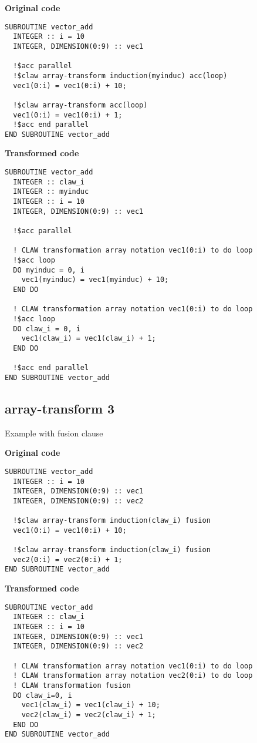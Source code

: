 \textbf{Original code}
\begin{lstlisting}
SUBROUTINE vector_add
  INTEGER :: i = 10
  INTEGER, DIMENSION(0:9) :: vec1

  !$acc parallel
  !$claw array-transform induction(myinduc) acc(loop)
  vec1(0:i) = vec1(0:i) + 10;

  !$claw array-transform acc(loop)
  vec1(0:i) = vec1(0:i) + 1;
  !$acc end parallel
END SUBROUTINE vector_add
\end{lstlisting}


\textbf{Transformed code}
\begin{lstlisting}
SUBROUTINE vector_add
  INTEGER :: claw_i
  INTEGER :: myinduc
  INTEGER :: i = 10
  INTEGER, DIMENSION(0:9) :: vec1

  !$acc parallel

  ! CLAW transformation array notation vec1(0:i) to do loop
  !$acc loop
  DO myinduc = 0, i
    vec1(myinduc) = vec1(myinduc) + 10;
  END DO

  ! CLAW transformation array notation vec1(0:i) to do loop
  !$acc loop
  DO claw_i = 0, i
    vec1(claw_i) = vec1(claw_i) + 1;
  END DO
  
  !$acc end parallel
END SUBROUTINE vector_add
\end{lstlisting}

\subsection{array-transform 3}
\label{array-transform3}
Example with fusion clause
 
\textbf{Original code}
\begin{lstlisting}
SUBROUTINE vector_add
  INTEGER :: i = 10
  INTEGER, DIMENSION(0:9) :: vec1
  INTEGER, DIMENSION(0:9) :: vec2

  !$claw array-transform induction(claw_i) fusion
  vec1(0:i) = vec1(0:i) + 10;

  !$claw array-transform induction(claw_i) fusion
  vec2(0:i) = vec2(0:i) + 1;
END SUBROUTINE vector_add
\end{lstlisting}


\textbf{Transformed code}
\begin{lstlisting}
SUBROUTINE vector_add
  INTEGER :: claw_i
  INTEGER :: i = 10
  INTEGER, DIMENSION(0:9) :: vec1
  INTEGER, DIMENSION(0:9) :: vec2

  ! CLAW transformation array notation vec1(0:i) to do loop
  ! CLAW transformation array notation vec2(0:i) to do loop
  ! CLAW transformation fusion
  DO claw_i=0, i
    vec1(claw_i) = vec1(claw_i) + 10;
    vec2(claw_i) = vec2(claw_i) + 1;
  END DO
END SUBROUTINE vector_add
\end{lstlisting}



